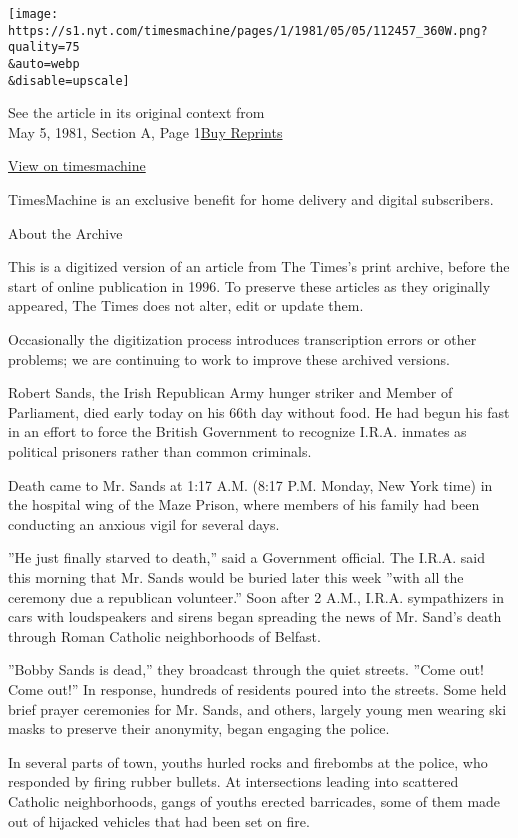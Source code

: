 \texttt{[image: https://s1.nyt.com/timesmachine/pages/1/1981/05/05/112457\_360W.png?quality=75\\\&auto=webp\\\&disable=upscale]}

See the article in its original context from\\
May 5, 1981, Section A, Page
1\href{https://store.nytimes.com/collections/new-york-times-page-reprints?utm_source=nytimes\&utm_medium=article-page\&utm_campaign=reprints}{Buy
Reprints}

\href{http://timesmachine.nytimes.com/timesmachine/1981/05/05/112457.html}{View
on timesmachine}

TimesMachine is an exclusive benefit for home delivery and digital
subscribers.

About the Archive

This is a digitized version of an article from The Times's print
archive, before the start of online publication in 1996. To preserve
these articles as they originally appeared, The Times does not alter,
edit or update them.

Occasionally the digitization process introduces transcription errors or
other problems; we are continuing to work to improve these archived
versions.

Robert Sands, the Irish Republican Army hunger striker and Member of
Parliament, died early today on his 66th day without food. He had begun
his fast in an effort to force the British Government to recognize
I.R.A. inmates as political prisoners rather than common criminals.

Death came to Mr. Sands at 1:17 A.M. (8:17 P.M. Monday, New York time)
in the hospital wing of the Maze Prison, where members of his family had
been conducting an anxious vigil for several days.

''He just finally starved to death,'' said a Government official. The
I.R.A. said this morning that Mr. Sands would be buried later this week
''with all the ceremony due a republican volunteer.'' Soon after 2 A.M.,
I.R.A. sympathizers in cars with loudspeakers and sirens began spreading
the news of Mr. Sand's death through Roman Catholic neighborhoods of
Belfast.

''Bobby Sands is dead,'' they broadcast through the quiet streets.
''Come out! Come out!'' In response, hundreds of residents poured into
the streets. Some held brief prayer ceremonies for Mr. Sands, and
others, largely young men wearing ski masks to preserve their anonymity,
began engaging the police.

In several parts of town, youths hurled rocks and firebombs at the
police, who responded by firing rubber bullets. At intersections leading
into scattered Catholic neighborhoods, gangs of youths erected
barricades, some of them made out of hijacked vehicles that had been set
on fire.

